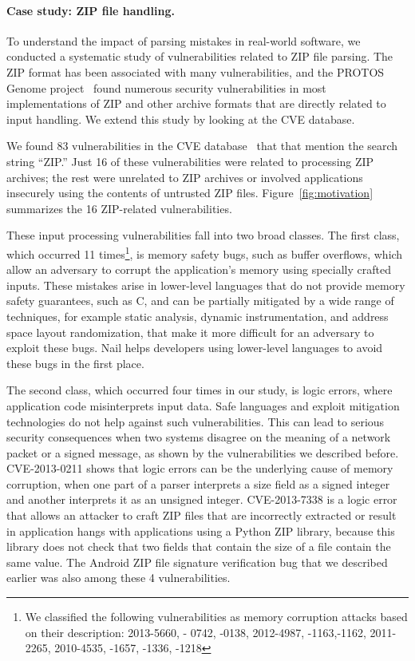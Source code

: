 \paragraph{Case study: ZIP file handling.}

To understand the impact of parsing mistakes in real-world software,
we conducted a systematic study of
vulnerabilities related to ZIP file parsing.  
The ZIP format has been associated with many vulnerabilities, and the
PROTOS Genome project~\cite{protos-c10-archive} found numerous security vulnerabilities in most
implementations of ZIP and other archive formats that are directly
related to input handling. We extend this study by looking at the CVE database.



We found 83 vulnerabilities in the CVE database~\cite{cve-database} that
that mention the search string ``ZIP.''  Just 16 of these vulnerabilities
were related to processing ZIP archives; the rest were unrelated to ZIP
archives or involved applications insecurely using the contents of untrusted
ZIP files.  Figure~\ref{fig:motivation} summarizes the 16 ZIP-related
vulnerabilities.

These input processing vulnerabilities fall into two broad classes.  The first
class, which occurred 11 times\footnote{We classified the following vulnerabilities as memory corruption
    attacks based on their description: 2013-5660, - 0742, -0138, 2012-4987, -1163,-1162, 2011-2265,
    2010-4535, -1657, -1336, -1218}, is memory safety bugs, such as buffer overflows, which allow an
adversary to corrupt the application's memory using specially crafted
inputs.  These mistakes arise in lower-level languages that do not
provide memory safety guarantees, such as C, and can be partially
mitigated by a wide range of techniques, for example static analysis,
dynamic instrumentation, and address space layout randomization, that
make it more difficult for an adversary to exploit these bugs.
Nail helps developers using lower-level languages to avoid these bugs
in the first place.

The second class, which occurred four times in our study,
is logic errors, where application code
misinterprets input data. Safe languages and exploit mitigation technologies do not help against
such vulnerabilities. This can lead to serious security consequences when two systems disagree on
the meaning of a network packet or a signed message, as shown by the vulnerabilities we described
before. CVE-2013-0211 shows that logic errors can be the underlying cause of memory corruption, when
one part of a parser interprets a size field as a signed integer and another interprets it as an
unsigned integer. CVE-2013-7338 is a logic error that allows an attacker to craft ZIP files that are
incorrectly extracted or result in application hangs with applications using a Python ZIP library,
because this library does not check that two fields that contain the size of a file contain the same value.
The Android ZIP file signature verification bug that we described
earlier was also among these 4 vulnerabilities.

